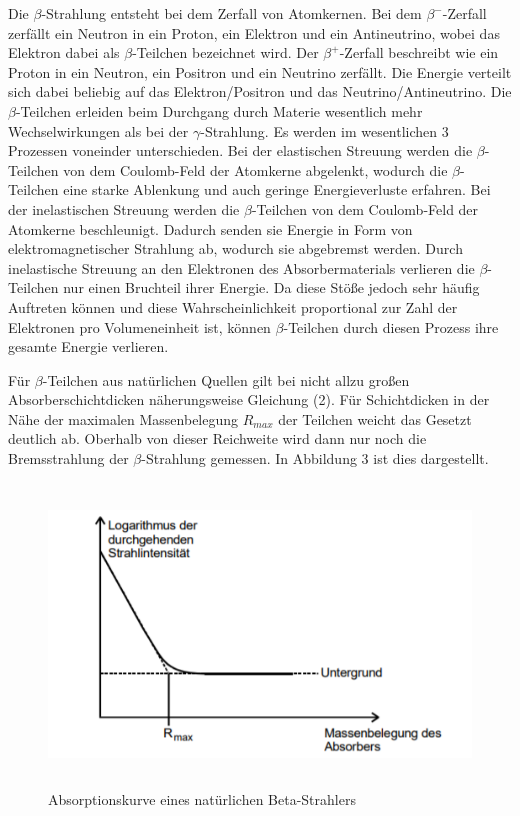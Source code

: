 Die $\beta$-Strahlung entsteht bei dem Zerfall von Atomkernen. Bei dem $\beta^{-}$-Zerfall zerfällt ein Neutron in ein Proton, ein Elektron
und ein Antineutrino, wobei das Elektron dabei als $\beta$-Teilchen bezeichnet wird. Der $\beta^{+}$-Zerfall beschreibt wie ein Proton in ein
Neutron, ein Positron und ein Neutrino zerfällt.
Die Energie verteilt sich dabei beliebig
auf das Elektron/Positron und das Neutrino/Antineutrino.
Die $\beta$-Teilchen erleiden beim Durchgang durch Materie wesentlich mehr Wechselwirkungen als bei der $\gamma$-Strahlung. Es werden
im wesentlichen 3 Prozessen voneinder unterschieden. Bei der elastischen Streuung werden die $\beta$-Teilchen von dem
Coulomb-Feld der Atomkerne abgelenkt, wodurch die $\beta$-Teilchen eine starke Ablenkung und auch geringe Energieverluste erfahren.
Bei der inelastischen Streuung werden die $\beta$-Teilchen von dem Coulomb-Feld der Atomkerne beschleunigt. Dadurch senden sie
Energie in Form von elektromagnetischer Strahlung ab, wodurch sie abgebremst werden.
Durch inelastische Streuung an den Elektronen des Absorbermaterials verlieren die $\beta$-Teilchen nur einen Bruchteil
ihrer Energie. Da diese Stöße jedoch sehr häufig Auftreten können und diese Wahrscheinlichkeit proportional zur Zahl der
Elektronen pro Volumeneinheit ist, können $\beta$-Teilchen durch diesen Prozess ihre gesamte Energie verlieren.

Für $\beta$-Teilchen aus natürlichen Quellen gilt bei nicht allzu großen Absorberschichtdicken näherungsweise Gleichung (2). Für
Schichtdicken in der Nähe der maximalen Massenbelegung $R_{max}$ der Teilchen weicht das Gesetzt deutlich ab. Oberhalb von dieser
Reichweite wird dann nur noch die Bremsstrahlung der $\beta$-Strahlung gemessen. In Abbildung 3 ist dies dargestellt.

\begin{figure}[H]
  \centering
  \includegraphics[height=8cm]{absorptionskurve.PNG}
  \caption{Absorptionskurve eines natürlichen Beta-Strahlers \cite{sample}}
  \label{fig:Linienspektrum}
\end{figure}

